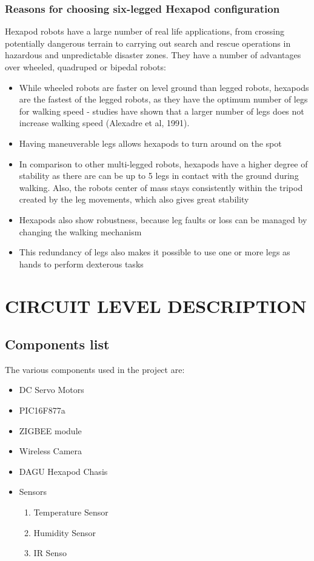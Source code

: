 \documentclass{report}
\begin{document}
 \subsection*{Reasons for choosing six-legged Hexapod configuration}
Hexapod robots have a large number of real life applications, from crossing potentially dangerous terrain to carrying out search and rescue operations in hazardous and unpredictable disaster zones. They have a number of advantages over wheeled, quadruped or bipedal robots:\\
\begin{itemize}
\item While wheeled robots are faster on level ground than legged robots, hexapods are the fastest of the
legged robots, as they have the optimum number of legs for walking speed - studies have shown
that a larger number of legs does not increase walking speed (Alexadre et al, 1991).
\item Having maneuverable legs allows hexapods to turn around on the spot
\item In comparison to other multi-legged robots, hexapods have a higher degree of stability as there are can be up to 5 legs in contact with the ground during walking. Also, the robots center of mass stays consistently within the tripod created by the leg movements, which also gives great stability
\item Hexapods also show robustness, because leg faults or loss can be managed by changing the walking
mechanism
\item This redundancy of legs also makes it possible to use one or more legs as hands to perform dexterous
tasks
\end{itemize}
\chapter{CIRCUIT LEVEL DESCRIPTION}
\section{Components list}
The various components used in the project are:

\begin{itemize}
\item DC Servo Motors
\item PIC16F877a
\item ZIGBEE module
\item Wireless Camera
\item DAGU Hexapod Chasis
\item Sensors
\begin{enumerate}
\item Temperature Sensor
\item Humidity Sensor
\item IR Senso
\end{enumerate}
\end{itemize}
\end{document}

